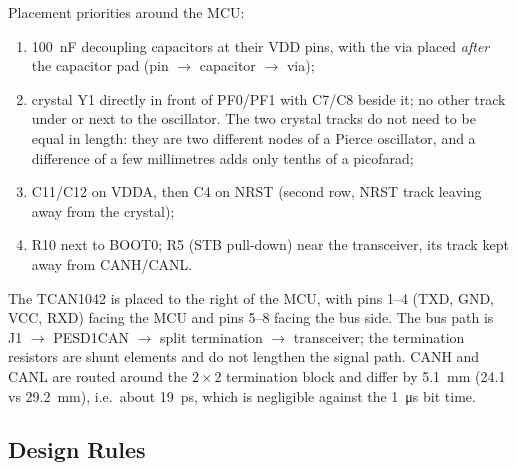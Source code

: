 \documentclass[11pt,a4paper]{article}
\begin{document}
Placement priorities around the MCU:
\begin{enumerate}
    \item \qty{100}{nF} decoupling capacitors at their VDD pins, with the via placed \textit{after} the capacitor
    pad (pin $\to$ capacitor $\to$ via);
    \item crystal Y1 directly in front of PF0/PF1 with C7/C8 beside it; no other track under or next
    to the oscillator. The two crystal tracks do not need to be equal in length: they are two
    different nodes of a Pierce oscillator, and a difference of a few millimetres adds only tenths
    of a picofarad;
    \item C11/C12 on VDDA, then C4 on NRST (second row, NRST track leaving away from the
    crystal);
    \item R10 next to BOOT0; R5 (STB pull-down) near the transceiver, its track kept away from
    CANH/CANL.
\end{enumerate}

The TCAN1042 is placed to the right of the MCU, with pins 1--4 (TXD, GND, VCC, RXD)
facing the MCU and pins 5--8 facing the bus side. The bus path is J1 $\to$ PESD1CAN $\to$ split
termination $\to$ transceiver; the termination resistors are shunt elements and do not lengthen
the signal path. CANH and CANL are routed around the $2{\times}2$ termination block and differ by
\qty{5.1}{mm} (24.1 vs \qty{29.2}{mm}), i.e.\ about \qty{19}{ps}, which is negligible against the \qty{1}{\micro s} bit time.

\subsection{Design Rules}
\end{document}
